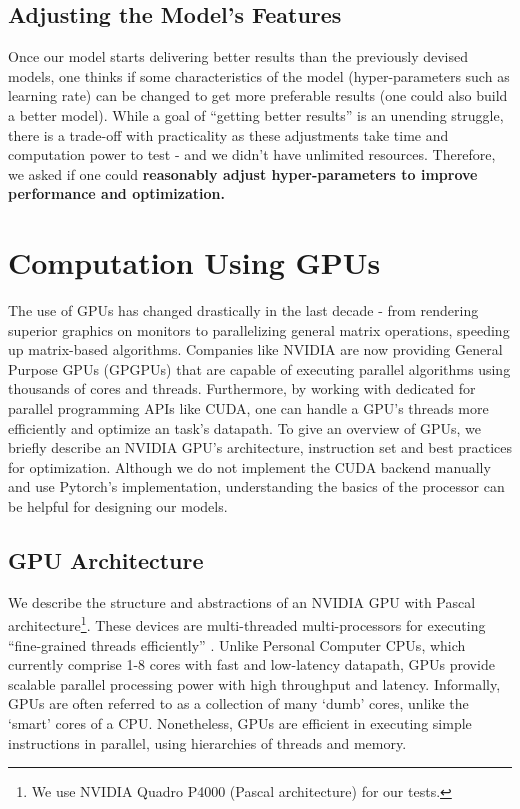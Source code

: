 \subsection{Adjusting the Model's Features} \label{sec:Important Questions - Adjusting the Model's Features}
Once our model starts delivering better results than the previously devised models, one thinks if some characteristics of the model (hyper-parameters such as learning rate) can be changed to get more preferable results (one could also build a better model). While a goal of ``getting better results'' is an unending struggle, there is a trade-off with practicality as these adjustments take time and computation power to test - and we didn't have unlimited resources. Therefore, we asked if one could \textbf{reasonably adjust hyper-parameters to improve performance and optimization.}

\section{Computation Using GPUs} \label{sec:Computation Using GPUs}
The use of GPUs has changed drastically in the last decade - from rendering superior graphics on monitors to parallelizing general matrix operations, speeding up matrix-based algorithms. Companies like NVIDIA are now providing General Purpose GPUs (GPGPUs) that are capable of executing parallel algorithms using thousands of cores and threads. Furthermore, by working with dedicated for parallel programming APIs like CUDA, one can handle a GPU's threads more efficiently and optimize an task's datapath. To give an overview of GPUs, we briefly describe an NVIDIA GPU's architecture, instruction set and best practices for optimization. Although we do not implement the CUDA backend manually and use Pytorch's implementation, understanding the basics of the processor can be helpful for designing our models.

\subsection{GPU Architecture} \label{sec:GPU Architecture}
We describe the structure and abstractions of an NVIDIA GPU with Pascal architecture\footnote{We use NVIDIA Quadro P4000 (Pascal architecture) for our tests.}. These devices are multi-threaded multi-processors for executing ``fine-grained threads efficiently'' \cite[Appendix~B.4]{PattersonARM}\cite{NVIDIA}. Unlike Personal Computer CPUs, which currently comprise 1-8 cores with fast and low-latency datapath, GPUs provide scalable parallel processing power with high throughput and latency. Informally, GPUs are often referred to as a collection of many `dumb' cores, unlike the `smart' cores of a CPU. Nonetheless, GPUs are efficient in executing simple instructions in parallel, using hierarchies of threads and memory.

